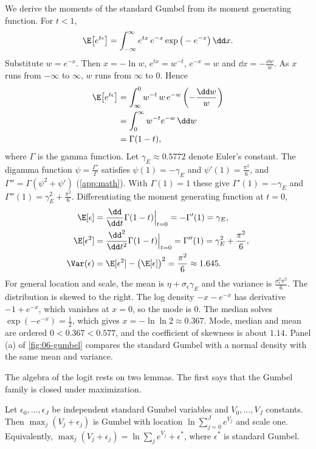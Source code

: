 We derive the moments of the standard Gumbel from its moment generating function. For $t < 1$,
\begin{equation*}
\E\big[e^{t\epsilon}\big] = \int_{-\infty}^{\infty} e^{tx}\,e^{-x}\exp\big(-e^{-x}\big)\,\dd x .
\end{equation*}
Substitute $w = e^{-x}$. Then $x = -\ln w$, $e^{tx} = w^{-t}$, $e^{-x} = w$ and $\dd x = -\frac{\dd w}{w}$. As
$x$ runs from $-\infty$ to $\infty$, $w$ runs from $\infty$ to $0$. Hence
\begin{align*}
\E\big[e^{t\epsilon}\big] &= \int_{\infty}^{0} w^{-t}\,w\,e^{-w}\left(-\frac{\dd w}{w}\right) \\
&= \int_0^\infty w^{-t}e^{-w}\,\dd w \\
&= \Gamma(1 - t),
\end{align*}
where $\Gamma$ is the gamma function. Let $\gamma_E \approx 0.5772$ denote Euler's constant. The digamma function
$\psi = \frac{\Gamma'}{\Gamma}$ satisfies $\psi(1) = -\gamma_E$ and $\psi'(1) = \frac{\pi^2}{6}$, and
$\Gamma'' = \Gamma(\psi^2 + \psi')$ (\cref{app:math}). With $\Gamma(1) = 1$ these give $\Gamma'(1) = -\gamma_E$ and
$\Gamma''(1) = \gamma_E^2 + \frac{\pi^2}{6}$. Differentiating the moment generating function at $t = 0$,
\begin{align*}
\E[\epsilon] &= \frac{\dd}{\dd t}\Gamma(1 - t)\Big|_{t=0} = -\Gamma'(1) = \gamma_E, \\
\E[\epsilon^2] &= \frac{\dd^2}{\dd t^2}\Gamma(1 - t)\Big|_{t=0} = \Gamma''(1) = \gamma_E^2 + \frac{\pi^2}{6}, \\
\Var(\epsilon) &= \E[\epsilon^2] - \big(\E[\epsilon]\big)^2 = \frac{\pi^2}{6} \approx 1.645 .
\end{align*}
For general location and scale, the mean is $\eta + \sigma_\epsilon\gamma_E$ and the variance is
$\frac{\sigma_\epsilon^2\pi^2}{6}$. The distribution is skewed to the right. The log density $-x - e^{-x}$ has
derivative $-1 + e^{-x}$, which vanishes at $x = 0$, so the mode is $0$. The median solves
$\exp(-e^{-x}) = \frac{1}{2}$, which gives $x = -\ln\ln 2 \approx 0.367$. Mode, median and mean are ordered
$0 < 0.367 < 0.577$, and the coefficient of skewness is about $1.14$. Panel (a) of \cref{fig:06-gumbel}
compares the standard Gumbel with a normal density with the same mean and variance.

The algebra of the logit rests on two lemmas. The first says that the Gumbel family is closed under
maximization.

\begin{lemma}\label{lem:06-maxstable}
Let $\epsilon_0, \dots, \epsilon_J$ be independent standard Gumbel variables and $V_0, \dots, V_J$ constants. Then
$\max_j (V_j + \epsilon_j)$ is Gumbel with location $\ln\sum_{j=0}^J e^{V_j}$ and scale one. Equivalently,
$\max_j(V_j + \epsilon_j) = \ln\sum_j e^{V_j} + \epsilon^*$, where $\epsilon^*$ is standard Gumbel.
\end{lemma}

